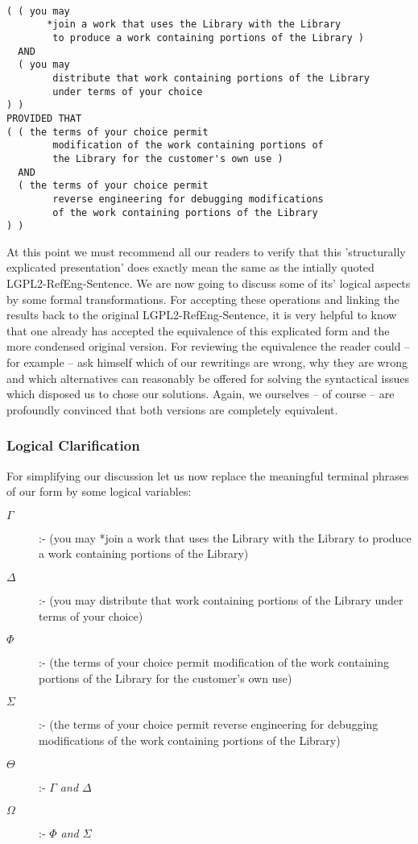 \begin{verbatim}

( ( you may 
       *join a work that uses the Library with the Library
        to produce a work containing portions of the Library )
  AND 
  ( you may 
        distribute that work containing portions of the Library
        under terms of your choice 
) )
PROVIDED THAT
( ( the terms of your choice permit 
        modification of the work containing portions of 
        the Library for the customer's own use )
  AND
  ( the terms of your choice permit
        reverse engineering for debugging modifications 
        of the work containing portions of the Library   
) )
\end{verbatim}

At this point we must recommend all our readers to verify that this
'structurally explicated presentation' does exactly mean the same as the
intially quoted LGPL2-RefEng-Sentence. We are now going to discuss some of its'
logical aspects by some formal transformations. For accepting these operations
and linking the results back to the original LGPL2-RefEng-Sentence, it is very
helpful to know that one already has accepted the equivalence of this explicated
form and the more condensed original version. For reviewing the equivalence the
reader could -- for example -- ask himself which of our rewritings are wrong,
why they are wrong and which alternatives can reasonably be offered for solving
the syntactical issues which disposed us to chose our solutions. Again, we
ourselves -- of course -- are profoundly convinced that both versions are
completely equivalent.

\subsubsection{Logical Clarification}

For simplifying our discussion let us now replace the meaningful terminal
phrases of our form by some logical variables:

\begin{description}
  \item[$\Gamma$] :- (you may *join a work that uses the Library with the
  Library to produce a work containing portions of the Library) 
  \item[$\Delta$] :- (you may distribute that work containing portions of the
  Library under terms of your choice)
  \item[$\Phi$] :- (the terms of your choice permit modification of the work 
  containing portions of the Library for the customer's own use)
  \item[$\Sigma$] :- (the terms of your choice permit reverse engineering for
  debugging modifications of the work containing portions of the Library)
  \item[$\Theta$] :- \emph{$\Gamma$ and $\Delta$}
  \item[$\Omega$] :- \emph{$\Phi$ and $\Sigma$}
\end{description}

